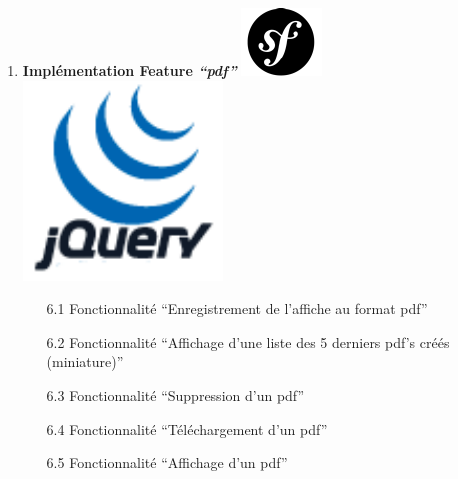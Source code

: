 \documentclass{article}
\begin{document}
\begin{sffamily}
\begin{enumerate}
\begin{enumerate}
	\end{enumerate}
\item \textbf{Implémentation Feature \textit{``pdf''}} \includegraphics[scale=0.5]{symfony.pdf}\includegraphics[scale=0.2]{jquery.pdf}
	\begin{enumerate}
		\item[6.1] Fonctionnalité ``Enregistrement de l'affiche au format pdf''
		\item[6.2] Fonctionnalité ``Affichage d'une liste des 5 derniers pdf's créés (miniature)''
		\item[6.3] Fonctionnalité ``Suppression d'un pdf''
		\item[6.4] Fonctionnalité ``Téléchargement d'un pdf''
		\item[6.5] Fonctionnalité ``Affichage d'un pdf''
	\end{enumerate}

\end{enumerate}
\end{sffamily}
\end{document}
